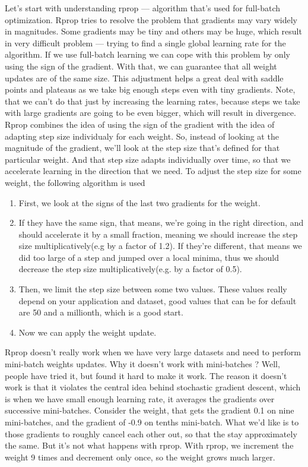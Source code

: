 Let’s start with understanding rprop — algorithm that’s used for full-batch optimization. 
Rprop tries to resolve the problem that gradients may vary widely in magnitudes.
Some gradients may be tiny and others may be huge, which result in very difficult problem —
trying to find a single global learning rate for the algorithm. 
If we use full-batch learning we can cope with this problem by only using the sign 
of the gradient.
With that, we can guarantee that all weight updates are of the same size. 
This adjustment helps a great deal with saddle points and plateaus as we take big enough steps
even with tiny gradients. 
Note, that we can’t do that just by increasing the learning rates, because steps we take with 
large gradients are going to be even bigger, which will result in divergence.
Rprop combines the idea of using the sign of the gradient with the idea of adapting step size
individualy for each weight.
So, instead of looking at the magnitude of the gradient, we’ll look at the step size that’s 
defined for that particular weight.
And that step size adapts individually over time, so that we accelerate learning in the
direction that we need. To adjust the step size for some weight, the following algorithm is used
\begin{enumerate}
    \item First, we look at the signs of the last two gradients for the weight.
    \item If they have the same sign, that means, we’re going in the right direction,
		and should accelerate it by a small fraction, meaning we should increase the step size
		multiplicatively(e.g by a factor of 1.2). 
		If they’re different, that means we did too large of a step and jumped over a
		local minima, thus we should decrease the step size multiplicatively(e.g. by a
		factor of 0.5).
    \item Then, we limit the step size between some two values. These values really depend on
		your application and dataset, good values that can be for default are 50 and a millionth, 
		which is a good start.
    \item Now we can apply the weight update.
\end{enumerate}

Rprop doesn’t really work when we have very large datasets and need to perform mini-batch weights
updates. 
Why it doesn’t work with mini-batches ? Well, people have tried it, but found it hard to make 
it work.
The reason it doesn’t work is that it violates the central idea behind stochastic gradient
descent, which is when we have small enough learning rate,
it averages the gradients over successive mini-batches.
Consider the weight, that gets the gradient 0.1 on nine mini-batches, and the gradient of -0.9 on
tenths mini-batch.
What we’d like is to those gradients to roughly cancel each other out, so that the stay
approximately the same.
But it’s not what happens with rprop. With rprop, we increment the weight 9 times and decrement
only once, so the weight grows much larger.

